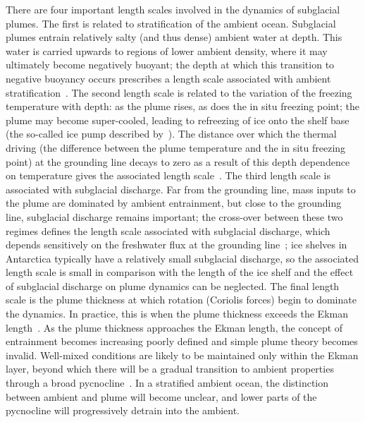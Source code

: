 \documentclass[openacc]{rsproca_new}%
\begin{document}
There are four important length scales involved in the dynamics of subglacial plumes. The first is related to stratification of the ambient ocean. Subglacial plumes entrain relatively salty (and thus dense) ambient water at depth. This water  is carried upwards to regions of lower ambient density, where it may ultimately become negatively buoyant; the depth at which this transition to negative buoyancy occurs prescribes a length scale associated with ambient stratification~\citep{Magorrian2016JGeoResOcean}. The second length scale is related to the variation of the freezing temperature with depth: as the plume rises, as does the in situ freezing point; the plume may become super-cooled, leading to refreezing of ice onto the shelf base (the so-called ice pump described by~\citet{Lewis1986JGeophysResOceans}). The distance over which the thermal driving (the difference between the plume temperature and the in situ freezing point) at the grounding line decays to zero as a result of this depth dependence on temperature gives the associated length scale~\citep{LaneSerff1995JGeophysResOceans}. The third length scale is associated with subglacial discharge. Far from the grounding line, mass inputs to the plume are dominated by ambient entrainment, but close to the grounding line, subglacial discharge remains important; the cross-over between these two regimes defines the length scale associated with subglacial discharge, which depends sensitively on the freshwater flux at the grounding line~\citep{Jenkins2011JPhysOcean}; ice shelves in Antarctica typically have a relatively small subglacial discharge, so the associated length scale is small in comparison with the length of the ice shelf and the effect of subglacial discharge on plume dynamics can be neglected. The final length scale is the plume thickness at which rotation (Coriolis forces) begin to dominate the dynamics. In practice, this is when the plume thickness exceeds the Ekman length~\citep{Jenkins2011JPhysOcean}. As the plume thickness approaches the Ekman length, the concept of entrainment becomes increasing poorly defined and simple plume theory becomes invalid.  Well-mixed conditions are likely to be maintained only within the Ekman layer, beyond which there will be a gradual transition to ambient properties through a broad pycnocline~\cite{Jenkins2021JPO}.  In a stratified ambient ocean, the distinction between ambient and plume will become unclear, and lower parts of the pycnocline will progressively detrain into the ambient.
\end{document}
